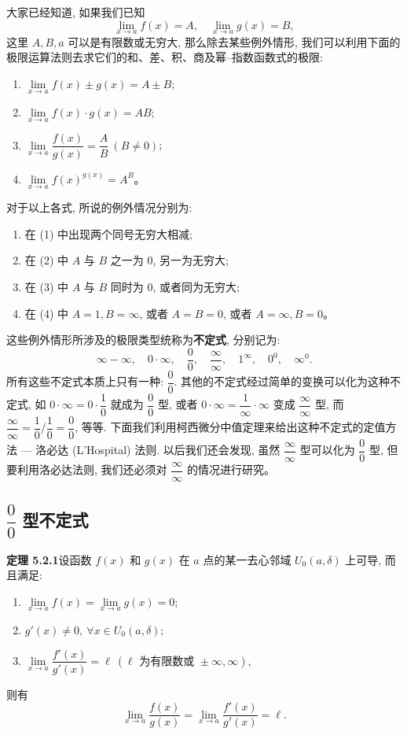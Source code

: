 \documentclass[UTF8, 12pt, fontset=fandol, oneside]{ctexart}
\begin{document}
大家已经知道, 如果我们已知
\[
  \lim_{x\to a}f(x)=A,\quad \lim_{x\to a}g(x)=B,
\]
这里 $A,B,a$ 可以是有限数或无穷大, 那么除去某些例外情形, 我们可以利用下面的极限运算法则去求它们的和、差、积、商及幂--指数函数式的极限:
\begin{enumerate}
  \item $\lim\limits_{x\to a} f(x)\pm g(x)=A\pm B$;
  \item $\lim\limits_{x\to a} f(x)\cdot g(x)=AB$;
  \item $\lim\limits_{x\to a}\dfrac{f(x)}{g(x)}=\dfrac AB\ (B\ne0)$;
  \item $\lim\limits_{x\to a} f(x)^{g(x)}=A^B$。
\end{enumerate}
对于以上各式, 所说的例外情况分别为:
\begin{enumerate}
  \item[(a)] 在 (1) 中出现两个同号无穷大相减;
  \item[(b)] 在 (2) 中 $A$ 与 $B$ 之一为 $0$, 另一为无穷大;
  \item[(c)] 在 (3) 中 $A$ 与 $B$ 同时为 $0$, 或者同为无穷大;
  \item[(d)] 在 (4) 中 $A=1,B=\infty$, 或者 $A=B=0$, 或者 $A=\infty,B=0$。
\end{enumerate}
这些例外情形所涉及的极限类型统称为\textbf{不定式}, 分别记为:
\[
  \infty-\infty,\quad 0\cdot\infty,\quad \frac00,\quad \frac\infty\infty,\quad 1^\infty,\quad 0^0,\quad \infty^0.
\]
所有这些不定式本质上只有一种: $\dfrac00$. 其他的不定式经过简单的变换可以化为这种不定式, 如 $0\cdot\infty=0\cdot\dfrac10$ 就成为 $\dfrac00$ 型, 或者 $0\cdot\infty=\dfrac1\infty\cdot\infty$ 变成 $\dfrac\infty\infty$ 型, 而 $\dfrac\infty\infty=\dfrac10/\dfrac10=\dfrac00$, 等等. 下面我们利用柯西微分中值定理来给出这种不定式的定值方法 --- 洛必达 (L'Hospital) 法则. 以后我们还会发现, 虽然 $\dfrac\infty\infty$ 型可以化为 $\dfrac00$ 型, 但要利用洛必达法则, 我们还必须对 $\dfrac\infty\infty$ 的情况进行研究。

\subsection{$\dfrac00$ 型不定式}

\noindent\textbf{定理 5.2.1}\quad 设函数 $f(x)$ 和 $g(x)$ 在 $a$ 点的某一去心邻域 $U_0(a,\delta)$ 上可导, 而且满足:
\begin{enumerate}
  \item $\lim\limits_{x\to a}f(x)=\lim\limits_{x\to a}g(x)=0$;
  \item $g'(x)\ne0,\ \forall x\in U_0(a,\delta)$;
  \item $\lim\limits_{x\to a}\dfrac{f'(x)}{g'(x)}=\ell\ (\ell\text{ 为有限数或 }\pm\infty,\infty)$,
\end{enumerate}
则有
\[
  \lim_{x\to a}\frac{f(x)}{g(x)}
  =
  \lim_{x\to a}\frac{f'(x)}{g'(x)}
  =
  \ell.
\]
\end{document}
